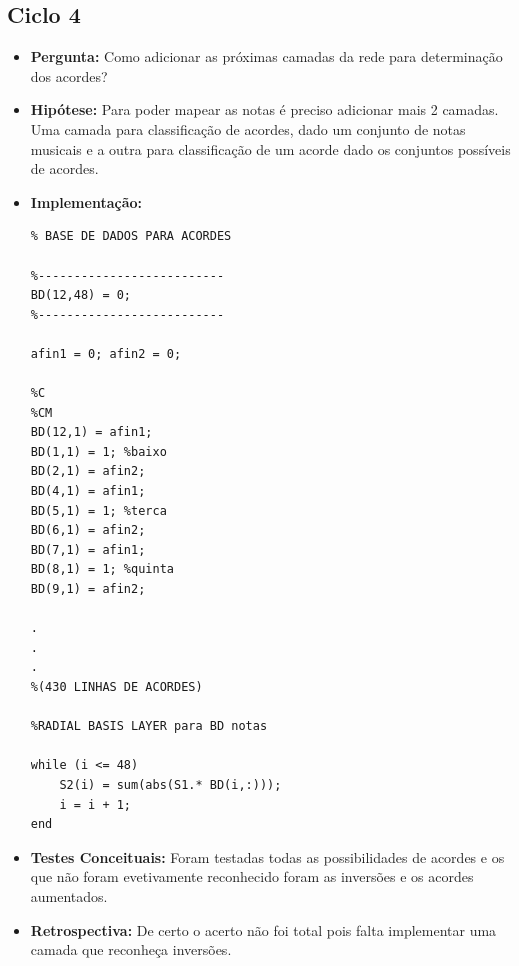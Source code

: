 \subsection{Ciclo 4}
\begin{itemize}
\item \textbf{Pergunta:} Como adicionar as próximas camadas da rede para determinação dos acordes?
\item \textbf{Hipótese:} Para poder mapear as notas é preciso adicionar mais 2 camadas. Uma camada para classificação de acordes, dado um conjunto de notas musicais e a outra para classificação de um acorde dado os conjuntos possíveis de acordes.
\item \textbf{Implementação:} 
\begin{lstlisting}
% BASE DE DADOS PARA ACORDES

%--------------------------
BD(12,48) = 0;
%--------------------------

afin1 = 0; afin2 = 0;

%C
%CM
BD(12,1) = afin1;
BD(1,1) = 1; %baixo
BD(2,1) = afin2;
BD(4,1) = afin1;
BD(5,1) = 1; %terca
BD(6,1) = afin2;
BD(7,1) = afin1;
BD(8,1) = 1; %quinta
BD(9,1) = afin2;

.
.
.
%(430 LINHAS DE ACORDES)

%RADIAL BASIS LAYER para BD notas

while (i <= 48)
    S2(i) = sum(abs(S1.* BD(i,:)));
    i = i + 1;
end

\end{lstlisting}
\item \textbf{Testes Conceituais:} Foram testadas todas as possibilidades de acordes e os que não foram evetivamente reconhecido foram as inversões e os acordes aumentados.
\item \textbf{Retrospectiva:} De certo o acerto não foi total pois falta implementar uma camada que reconheça inversões.
\end{itemize}

